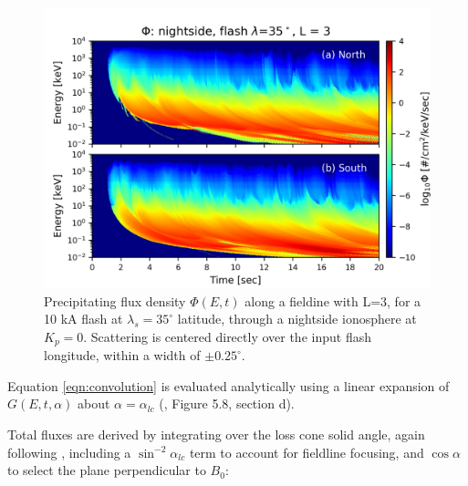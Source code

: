 \begin{figure}[ht]
\begin{center}
\includegraphics{figures/phi_E-t_spectra.png}
\caption[Precipitating flux density E-t spectra for $\lambda_s=35^\circ$ and L=3]{Precipitating flux density $\Phi(E,t)$ along a fieldine with L=3, for a 10 kA flash at $\lambda_s=35^\circ$ latitude, through a nightside ionosphere at $K_p=0$. Scattering is centered directly over the input flash longitude, within a width of $\pm0.25^\circ.$}
\label{fig:phi_E-t_spectra}
\end{center}
\end{figure}

Equation \eqref{eqn:convolution} is evaluated analytically using a linear expansion of $G(E,t,\alpha)$ about $\alpha = \alpha_{lc}$ (\cite{Bortnik2005}, Figure 5.8, section d).

%
%
Total fluxes are derived by integrating over the loss cone solid angle, again following \cite{Bortnik2005}, including a $\sin^{-2}\alpha_{lc}$ term to account for fieldline focusing, and $\cos\alpha$ to select the plane perpendicular to $B_0$:

